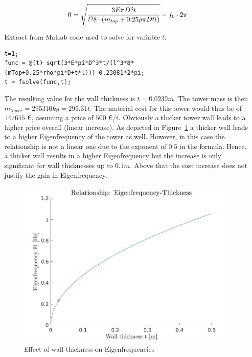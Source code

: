 \documentclass[10pt]{article}
\begin{document}
\begin{equation*}
0 = \sqrt{\frac{3 E \pi D^3 t}{l^3 8 \cdot (m_{top} + 0.25\rho \pi D t l)}} -f_0 \cdot 2 \pi \\
\end{equation*}

Extract from Matlab code used to solve for variable $t$:\\

\begin{lstlisting}
t=1;
func = @(t) sqrt(3*E*pi*D^3*t/(l^3*8*(mTop+0.25*rho*pi*D+t*l)))-0.23081*2*pi;
t = fsolve(func,t);
\end{lstlisting}

The resulting value for the wall thickness is $t=0.0239m$. The tower mass is then $m_{tower}=295310 kg = 295.31t$. The material cost for this tower would thus be of $147655$ \euro, assuming a price of $500$ \euro /t. Obviously a thicker tower wall leads to a higher price overall (linear increase). As depicted in Figure~\ref{fig:eigfreqWall} a thicker wall leads to a higher Eigenfrequency of the tower as well. However, in this case the relationship is not a linear one due to the exponent of $0.5$ in the formula. Hence, a thicker wall results in a higher Eigenfrequency but the increase is only significant for wall thicknesses up to $0.1m$. Above that the cost increase does not justify the gain in Eigenfrequency.

\begin{figure}[H]
\centering
\includegraphics[width=0.6\linewidth]{../figures/eigenfrequency.jpg}
\caption{Effect of wall thickness on Eigenfrequencies}
\label{fig:eigfreqWall}
\end{figure} 
\end{document}
